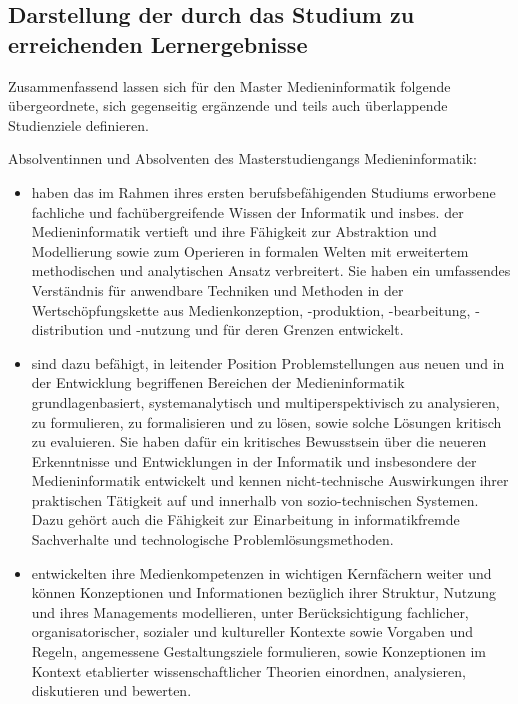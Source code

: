 \subsection{Darstellung der durch das Studium zu erreichenden
Lernergebnisse}\label{darstellung-der-durch-das-studium-zu-erreichenden-lernergebnisse-1}

Zusammenfassend lassen sich für den Master Medieninformatik folgende
übergeordnete, sich gegenseitig ergänzende und teils auch überlappende
Studienziele definieren.

Absolventinnen und Absolventen des Masterstudiengangs Medieninformatik:

\begin{itemize}
\tightlist
\item
  haben das im Rahmen ihres ersten berufsbefähigenden Studiums erworbene
  fachliche und fachübergreifende Wissen der Informatik und insbes. der
  Medieninformatik vertieft und ihre Fähigkeit zur Abstraktion und
  Modellierung sowie zum Operieren in formalen Welten mit erweitertem
  methodischen und analytischen Ansatz verbreitert. Sie haben ein
  umfassendes Verständnis für anwendbare Techniken und Methoden in der
  Wertschöpfungskette aus Medienkonzeption, -produktion, -bearbeitung,
  -distribution und -nutzung und für deren Grenzen entwickelt.
\item
  sind dazu befähigt, in leitender Position Problemstellungen aus neuen
  und in der Entwicklung begriffenen Bereichen der Medieninformatik
  grundlagenbasiert, systemanalytisch und multiperspektivisch zu
  analysieren, zu formulieren, zu formalisieren und zu lösen, sowie
  solche Lösungen kritisch zu evaluieren. Sie haben dafür ein kritisches
  Bewusstsein über die neueren Erkenntnisse und Entwicklungen in der
  Informatik und insbesondere der Medieninformatik entwickelt und kennen
  nicht-technische Auswirkungen ihrer praktischen Tätigkeit auf und
  innerhalb von sozio-technischen Systemen. Dazu gehört auch die
  Fähigkeit zur Einarbeitung in informatikfremde Sachverhalte und
  technologische Problemlösungsmethoden.
\item
  entwickelten ihre Medienkompetenzen in wichtigen Kernfächern weiter
  und können Konzeptionen und Informationen bezüglich ihrer Struktur,
  Nutzung und ihres Managements modellieren, unter Berücksichtigung
  fachlicher, organisatorischer, sozialer und kultureller Kontexte sowie
  Vorgaben und Regeln, angemessene Gestaltungsziele formulieren, sowie
  Konzeptionen im Kontext etablierter wissenschaftlicher Theorien
  einordnen, analysieren, diskutieren und bewerten.

\end{itemize}

